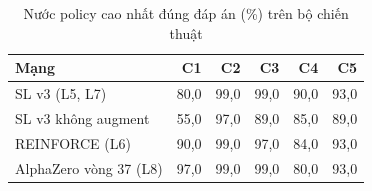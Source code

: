 \begin{table}[H]
  \centering
  \small
  \caption{Nước policy cao nhất đúng đáp án (\%) trên bộ chiến thuật}
  \label{tab:cs-mang-ct-top1}
  \begin{tabular}{lrrrrr}
    \toprule
    Mạng & C1 & C2 & C3 & C4 & C5 \\
    \midrule
    SL v3 (L5, L7) & 80,0 & 99,0 & 99,0 & 90,0 & 93,0 \\
    SL v3 không augment & 55,0 & 97,0 & 89,0 & 85,0 & 89,0 \\
    REINFORCE (L6) & 90,0 & 99,0 & 97,0 & 84,0 & 93,0 \\
    AlphaZero vòng 37 (L8) & 97,0 & 99,0 & 99,0 & 80,0 & 93,0 \\
    \bottomrule
  \end{tabular}
\end{table}
